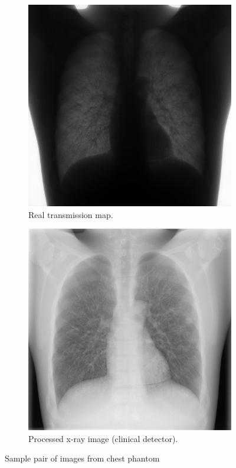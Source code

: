\documentclass[nomenclature, english, bibtex]{kththesis}
\numberwithin{listing}{chapter}
\begin{document}
\begin{figure}[H]
    \centering
    \begin{subfigure}[t]{0.45\textwidth}
        \includegraphics[width=\textwidth]{figures/comm_unprocessed_sample.jpg}
        \caption{Real transmission map.}
    \end{subfigure}
    \begin{subfigure}[t]{0.45\textwidth}
        \includegraphics[width=\textwidth]{figures/comm_processed_sample.jpg}
        \caption{Processed x-ray image (clinical detector).}
    \end{subfigure}
    \caption{Sample pair of images from chest phantom}
    \label{fig:chestPhantomImages}
\end{figure}
\end{document}
